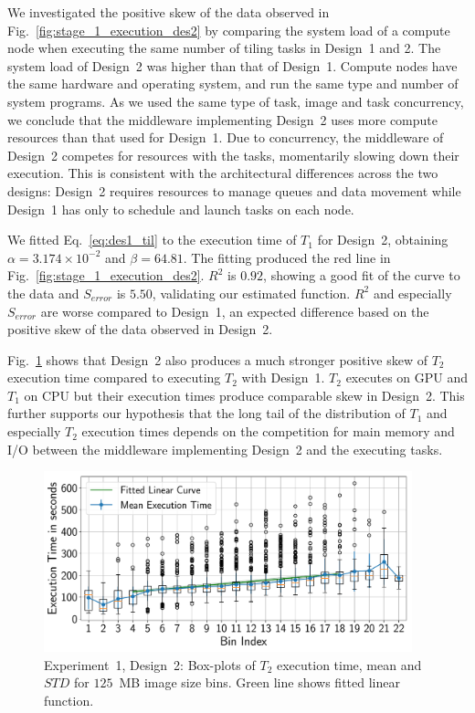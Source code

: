 We investigated the positive skew of the data observed in
Fig.~\ref{fig:stage_1_execution_des2} by comparing the system load of a
compute node when executing the same number of tiling tasks in Design~1 and
2. The system load of Design~2 was higher than that of Design~1. Compute
nodes have the same hardware and operating system, and run the same type and
number of system programs. As we used the same type of task, image and task
concurrency, we conclude that the middleware implementing Design~2 uses more
compute resources than that used for Design~1. Due to concurrency, the
middleware of Design~2 competes for resources with the tasks, momentarily
slowing down their execution. This is consistent with the architectural
differences across the two designs: Design~2 requires resources to manage
queues and data movement while Design~1 has only to schedule and launch tasks
on each node.

We fitted Eq.~\ref{eq:des1_til} to the execution time of $T_1$ for Design~2,
obtaining $\alpha = 3.174 \times 10^{-2}$ and $\beta = 64.81$. The fitting
produced the red line in Fig.~\ref{fig:stage_1_execution_des2}. $R^{2}$ is
$0.92$, showing a good fit of the curve to the data and $S_{error}$ is
$5.50$, validating our estimated function. $R^2$ and especially $S_{error}$
are worse compared to Design~1, an expected difference based on the positive
skew of the data observed in Design~2.


Fig.~\ref{fig:stage_2_execution_des2} shows that Design~2 also produces a
much stronger positive skew of $T_{2}$ execution time compared to executing
$T_{2}$ with Design~1. $T_{2}$ executes on GPU and $T_{1}$ on CPU but their
execution times produce comparable skew in Design~2. This further supports
our hypothesis that the long tail of the distribution of $T_{1}$ and
especially $T_{2}$ execution times depends on the competition for main
memory and I/O between the middleware implementing Design~2 and the executing
tasks.


\begin{figure}[ht!]
	\centering
	\includegraphics[width=0.95\textwidth]{figures/designs/stage_1_tx_box_des2.pdf}
	\caption{Experiment~1, Design~2: Box-plots of $T_{2}$ execution time,
		mean and $STD$ for $125$~MB image size bins. Green line shows fitted
		linear function.}\label{fig:stage_2_execution_des2}
\end{figure}


